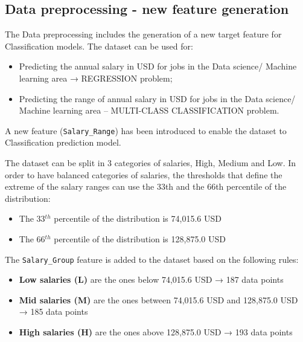 \documentclass[11pt,a4paper]{article}
\begin{document}
\subsection{Data preprocessing - new feature generation} 
The Data preprocessing includes the generation of a new target feature for Classification models. The dataset can be used for:
\begin{itemize}
\item Predicting the annual salary in USD for jobs in the Data science/ Machine learning area → REGRESSION problem;
\item Predicting the range of annual salary in USD for jobs in the Data science/ Machine learning area – MULTI-CLASS CLASSIFICATION problem.
\end{itemize}

A new feature (\texttt{Salary\_Range}) has been introduced to enable the dataset to Classification prediction model.

The dataset can be split in 3 categories of salaries, High, Medium and Low. In order to have balanced categories of salaries, the thresholds that define the extreme of the salary ranges can use the 33th and the 66th percentile of the distribution:
\begin{itemize}
\item The 33$^{th}$ percentile of the distribution is 74,015.6 USD
\item The 66$^{th}$ percentile of the distribution is 128,875.0 USD
\end{itemize}
The \texttt{Salary\_Group} feature is added to the dataset based on the following rules:
\begin{itemize}
\item \textbf{Low salaries (L)} are the ones below 74,015.6 USD → 187 data points
\item \textbf{Mid salaries (M)} are the ones between 74,015.6 USD and 128,875.0 USD → 185 data points
\item \textbf{High salaries (H)} are the ones above 128,875.0 USD → 193 data points
\end{itemize}
\end{document}
